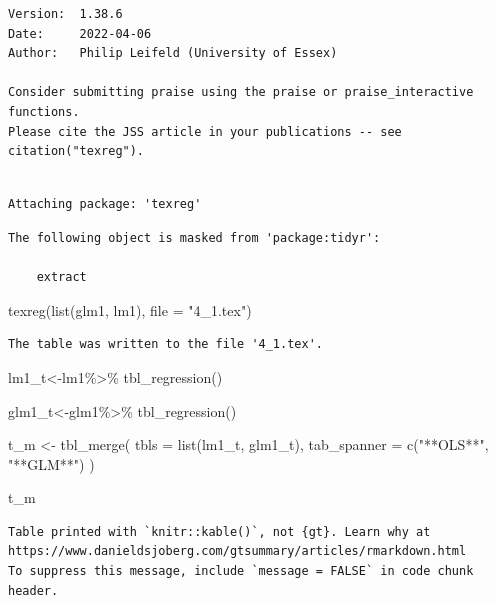 \documentclass[
  letterpaper,
  DIV=11,
  numbers=noendperiod]{scrreprt}
\newenvironment{Shaded}{\begin{snugshade}}{\end{snugshade}}
\newcommand{\AttributeTok}[1]{\textcolor[rgb]{0.40,0.45,0.13}{#1}}
\newcommand{\FunctionTok}[1]{\textcolor[rgb]{0.28,0.35,0.67}{#1}}
\newcommand{\NormalTok}[1]{\textcolor[rgb]{0.00,0.23,0.31}{#1}}
\newcommand{\OtherTok}[1]{\textcolor[rgb]{0.00,0.23,0.31}{#1}}
\newcommand{\SpecialCharTok}[1]{\textcolor[rgb]{0.37,0.37,0.37}{#1}}
\newcommand{\StringTok}[1]{\textcolor[rgb]{0.13,0.47,0.30}{#1}}
\begin{document}
\begin{verbatim}
Version:  1.38.6
Date:     2022-04-06
Author:   Philip Leifeld (University of Essex)

Consider submitting praise using the praise or praise_interactive functions.
Please cite the JSS article in your publications -- see citation("texreg").
\end{verbatim}

\begin{verbatim}

Attaching package: 'texreg'
\end{verbatim}

\begin{verbatim}
The following object is masked from 'package:tidyr':

    extract
\end{verbatim}

\begin{Shaded}
\begin{Highlighting}[]
\FunctionTok{texreg}\NormalTok{(}\FunctionTok{list}\NormalTok{(glm1, lm1), }\AttributeTok{file =} \StringTok{"4\_1.tex"}\NormalTok{)}
\end{Highlighting}
\end{Shaded}

\begin{verbatim}
The table was written to the file '4_1.tex'.
\end{verbatim}

\begin{Shaded}
\begin{Highlighting}[]
\NormalTok{lm1\_t}\OtherTok{\textless{}{-}}\NormalTok{lm1}\SpecialCharTok{\%\textgreater{}\%}
  \FunctionTok{tbl\_regression}\NormalTok{()}



\NormalTok{glm1\_t}\OtherTok{\textless{}{-}}\NormalTok{glm1}\SpecialCharTok{\%\textgreater{}\%}
  \FunctionTok{tbl\_regression}\NormalTok{()}
 

\NormalTok{t\_m }\OtherTok{\textless{}{-}} \FunctionTok{tbl\_merge}\NormalTok{(}
    \AttributeTok{tbls =} \FunctionTok{list}\NormalTok{(lm1\_t, glm1\_t),}
    \AttributeTok{tab\_spanner =} \FunctionTok{c}\NormalTok{(}\StringTok{"**OLS**"}\NormalTok{, }\StringTok{"**GLM**"}\NormalTok{)}
\NormalTok{  ) }

\NormalTok{t\_m}
\end{Highlighting}
\end{Shaded}

\begin{verbatim}
Table printed with `knitr::kable()`, not {gt}. Learn why at
https://www.danieldsjoberg.com/gtsummary/articles/rmarkdown.html
To suppress this message, include `message = FALSE` in code chunk header.
\end{verbatim}
\end{document}
